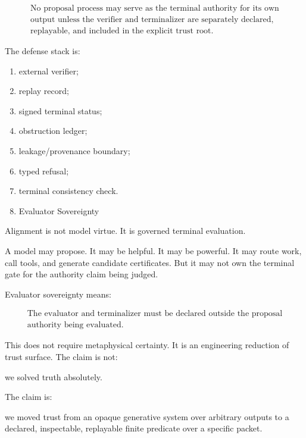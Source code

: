 \documentclass[
  10pt,
]{article}
\renewenvironment{quote}
  {\begin{leftbar}\small}
  {\end{leftbar}}
\begin{document}
\protect\hypertarget{math-E0162-0223}{}{\[
\boxed{
\begin{gathered}\text{No proposal process may serve as the terminal authority for its own}\\
\text{output unless the verifier and terminalizer are separately declared,}\\
\text{replayable, and included in the explicit trust root.}\end{gathered}
}
\]}

The defense stack is:

\begin{enumerate}
\def\labelenumi{\arabic{enumi}.}
\item
  external verifier;
\item
  replay record;
\item
  signed terminal status;
\item
  obstruction ledger;
\item
  leakage/provenance boundary;
\item
  typed refusal;
\item
  terminal consistency check.
\item
  Evaluator Sovereignty
\end{enumerate}

Alignment is not model virtue. It is governed terminal evaluation.

A model may propose. It may be helpful. It may be powerful. It may route work, call tools, and generate candidate certificates. But it may not own the terminal gate for the authority claim being judged.

Evaluator sovereignty means:

\protect\hypertarget{math-E0163-0224}{}{\[
\boxed{
\begin{gathered}\text{The evaluator and terminalizer must be declared outside the proposal}\\
\text{authority being evaluated.}\end{gathered}
}
\]}

This does not require metaphysical certainty. It is an engineering reduction of trust surface. The claim is not:

\begin{quote}
we solved truth absolutely.
\end{quote}

The claim is:

\begin{quote}
we moved trust from an opaque generative system over arbitrary outputs to a declared, inspectable, replayable finite predicate over a specific packet.
\end{quote}
\end{document}
